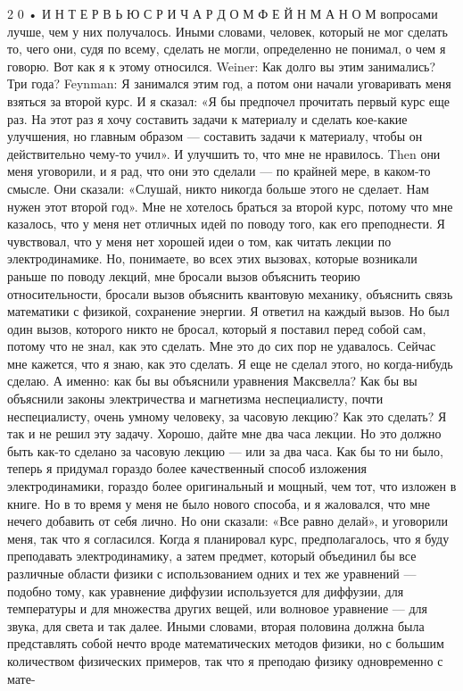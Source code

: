 \documentclass[10pt,oneside]{article}
\begin{document}
2 0 • И Н Т Е Р В Ь Ю  С  Р И Ч А Р Д О М  Ф Е Й Н М А Н О М вопросами лучше, чем у них получалось. Иными словами, человек, который не мог сделать то, чего они, судя по всему, сделать не могли, определенно не понимал, о чем я говорю. Вот как я к этому относился. Weiner: Как долго вы этим занимались? Три года? Feynman: Я занимался этим год, а потом они начали уговаривать меня взяться за второй курс. И я сказал: «Я бы предпочел прочитать первый курс еще раз. На этот раз я хочу составить задачи к материалу и сделать кое-какие улучшения, но главным образом --- составить задачи к материалу, чтобы он действительно чему-то учил». И улучшить то, что мне не нравилось. Then они меня уговорили, и я рад, что они это сделали --- по крайней мере, в каком-то смысле. Они сказали: «Слушай, никто никогда больше этого не сделает. Нам нужен этот второй год». Мне не хотелось браться за второй курс, потому что мне казалось, что у меня нет отличных идей по поводу того, как его преподнести. Я чувствовал, что у меня нет хорошей идеи о том, как читать лекции по электродинамике. Но, понимаете, во всех этих вызовах, которые возникали раньше по поводу лекций, мне бросали вызов объяснить теорию относительности, бросали вызов объяснить квантовую механику, объяснить связь математики с физикой, сохранение энергии. Я ответил на каждый вызов. Но был один вызов, которого никто не бросал, который я поставил перед собой сам, потому что не знал, как это сделать. Мне это до сих пор не удавалось. Сейчас мне кажется, что я знаю, как это сделать. Я еще не сделал этого, но когда-нибудь сделаю. А именно: как бы вы объяснили уравнения Максвелла? Как бы вы объяснили законы электричества и магнетизма неспециалисту, почти неспециалисту, очень умному человеку, за часовую лекцию? Как это сделать? Я так и не решил эту задачу. Хорошо, дайте мне два часа лекции. Но это должно быть как-то сделано за часовую лекцию --- или за два часа. Как бы то ни было, теперь я придумал гораздо более качественный способ изложения электродинамики, гораздо более оригинальный и мощный, чем тот, что изложен в книге. Но в то время у меня не было нового способа, и я жаловался, что мне нечего добавить от себя лично. Но они сказали: «Все равно делай», и уговорили меня, так что я согласился. Когда я планировал курс, предполагалось, что я буду преподавать электродинамику, а затем предмет, который объединил бы все различные области физики с использованием одних и тех же уравнений --- подобно тому, как уравнение диффузии используется для диффузии, для температуры и для множества других вещей, или волновое уравнение --- для звука, для света и так далее. Иными словами, вторая половина должна была представлять собой нечто вроде математических методов физики, но с большим количеством физических примеров, так что я преподаю физику одновременно с мате-\par
\end{document}

